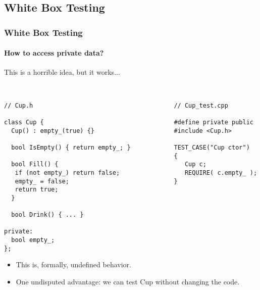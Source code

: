 \subsection{White Box Testing}
\begin{frame}[fragile,t]
\frametitle{White Box Testing}
\framesubtitle {How to access private data?}
This is a horrible idea, but it works...
{\scriptsize\
\begin{verbatim}
// Cup.h                                       // Cup_test.cpp                  
                                                                                
class Cup {                                    #define private public                                  
  Cup() : empty_(true) {}                      #include <Cup.h>                                                          

  bool IsEmpty() { return empty_; }            TEST_CASE("Cup ctor") 
                                               {                                         
  bool Fill() {                                   Cup c;                                 
   if (not empty_) return false;                  REQUIRE( c.empty_ ); 
   empty_ = false;                             }
   return true;
  }

  bool Drink() { ... }

private:
  bool empty_;
};
\end{verbatim}}
\begin{itemize}
\item This is, formally, undefined behavior.
\item One undisputed advantage: we can test Cup without changing the code.
\end{itemize}
\begin{center}
\end{center}
\end{frame}

